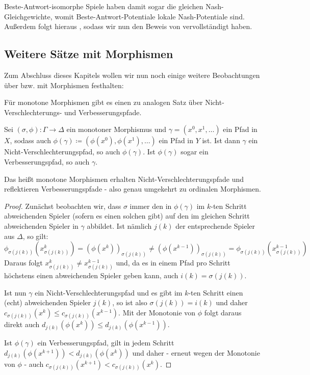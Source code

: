 Beste-Antwort-isomorphe Spiele haben damit sogar die gleichen Nash-Gleichgewichte, womit Beste-Antwort-Potentiale lokale Nash-Potentiale sind. Außerdem folgt hieraus , sodass wir nun den Beweis von  vervollständigt haben.


\subsection{Weitere Sätze mit Morphismen}

Zum Abschluss dieses Kapitels wollen wir nun noch einige weitere Beobachtungen über bzw. mit Morphismen festhalten:

Für monotone Morphismen gibt es einen zu  analogen Satz über Nicht-Verschlechterungs- und Verbesserungspfade.

\begin{prop}
	Sei $(\sigma, \phi): \Gamma \to \Delta$ ein monotoner Morphismus und $\gamma = (x^0, x^1, \dots)$ ein Pfad in $X$, sodass auch $\phi(\gamma) \coloneqq (\phi(x^0), \phi(x^1), \dots)$ ein Pfad in $Y$ ist. Ist dann $\gamma$ ein Nicht-Verschlechterungspfad, so auch $\phi(\gamma)$. Ist $\phi(\gamma)$ sogar ein Verbesserungspfad, so auch $\gamma$.
\end{prop}

Das heißt monotone Morphismen erhalten Nicht-Verschlechterungspfade und reflektieren Verbesserungspfade - also genau umgekehrt zu ordinalen Morphismen.

\begin{proof}
	Zunächst beobachten wir, dass $\sigma$ immer den in $\phi(\gamma)$ im $k$-ten Schritt abweichenden Spieler (sofern es einen solchen gibt) auf den im gleichen Schritt abweichenden Spieler in $\gamma$ abbildet. Ist nämlich $j(k)$ der entsprechende Spieler aus $\Delta$, so gilt:
	\[\phi_{\sigma(j(k))}\left(x_{\sigma(j(k))}^k\right) = \left(\phi(x^k)\right)_{\sigma(j(k))} \neq \left(\phi(x^{k-1})\right)_{\sigma(j(k))} = \phi_{\sigma(j(k))}\left(x_{\sigma(j(k))}^{k-1}\right)\]
	Daraus folgt $x_{\sigma(j(k))}^k \neq x_{\sigma(j(k))}^{k-1}$ und, da es in einem Pfad pro Schritt höchstens einen abweichenden Spieler geben kann, auch $i(k) = \sigma(j(k))$.
	
	Ist nun $\gamma$ ein Nicht-Verschlechterungspfad und es gibt im $k$-ten Schritt einen (echt) abweichenden Spieler $j(k)$, so ist also $\sigma(j(k)) = i(k)$ und daher $c_{\sigma(j(k))}(x^k) \leq c_{\sigma(j(k))}(x^{k-1})$. Mit der Monotonie von $\phi$ folgt daraus direkt auch $d_{j(k)}(\phi(x^k)) \leq d_{j(k)}(\phi(x^{k-1}))$.
	
	Ist $\phi(\gamma)$ ein Verbesserungspfad, gilt in jedem Schritt $d_{j(k)}(\phi(x^{k+1})) < d_{j(k)}(\phi(x^k))$ und daher - erneut wegen der Monotonie von $\phi$ - auch $c_{\sigma(j(k))}(x^{k+1}) < c_{\sigma(j(k))}(x^{k})$.
\end{proof}

